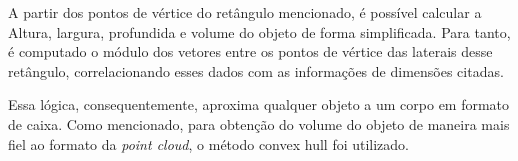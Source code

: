     A partir dos pontos de vértice do retângulo mencionado, é possível calcular a Altura, largura, profundida e volume do objeto de forma simplificada. Para tanto, é computado o módulo dos vetores entre os pontos de vértice das laterais desse retângulo, correlacionando esses dados com as informações de dimensões citadas.
    
    Essa lógica, consequentemente, aproxima qualquer objeto a um corpo em formato de caixa. Como mencionado, para obtenção do volume do objeto de maneira mais fiel ao formato da \textit{point cloud}, o método convex hull foi utilizado. 




